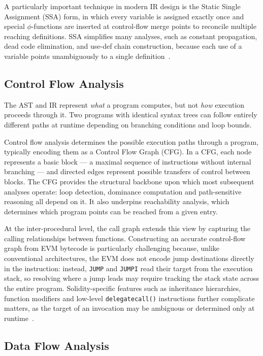 A particularly important technique in modern IR design is the Static Single Assignment (SSA) form, in which every variable is assigned exactly once and special $\phi$-functions are inserted at control-flow merge points to reconcile multiple reaching definitions. SSA simplifies many analyses, such as constant propagation, dead code elimination, and use-def chain construction, because each use of a variable points unambiguously to a single definition~\cite{rosen1988global}.

\subsection{Control Flow Analysis}
\label{subsec:control-flow}

The AST and IR represent \emph{what} a program computes, but not \emph{how} execution proceeds through it. Two programs with identical syntax trees can follow entirely different paths at runtime depending on branching conditions and loop bounds.

Control flow analysis determines the possible execution paths through a program, typically encoding them as a Control Flow Graph (CFG). In a CFG, each node represents a basic block --- a maximal sequence of instructions without internal branching --- and directed edges represent possible transfers of control between blocks. The CFG provides the structural backbone upon which most subsequent analyses operate: loop detection, dominance computation and path-sensitive reasoning all depend on it. It also underpins reachability analysis, which determines which program points can be reached from a given entry.

At the inter-procedural level, the call graph extends this view by capturing the calling relationships between functions. Constructing an accurate control-flow graph from EVM bytecode is particularly challenging because, unlike conventional architectures, the EVM does not encode jump destinations directly in the instruction: instead, \texttt{JUMP} and \texttt{JUMPI} read their target from the execution stack, so resolving where a jump leads may require tracking the stack state across the entire program. Solidity-specific features such as inheritance hierarchies, function modifiers and low-level \texttt{delegatecall()} instructions further complicate matters, as the target of an invocation may be ambiguous or determined only at runtime~\cite{contro2023ethersolve}.

\subsection{Data Flow Analysis}
\label{subsec:data-flow}

